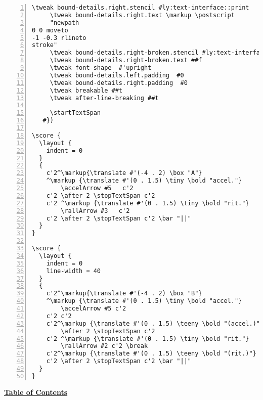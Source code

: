 \begin{Verbatim}[numbers=left,xleftmargin=5mm]
     \tweak bound-details.right.stencil #ly:text-interface::print
     \tweak bound-details.right.text \markup \postscript
     "newpath 
0 0 moveto 
-1 -0.3 rlineto 
stroke"
     \tweak bound-details.right-broken.stencil #ly:text-interface::print
     \tweak bound-details.right-broken.text ##f
     \tweak font-shape  #'upright
     \tweak bound-details.left.padding  #0
     \tweak bound-details.right.padding  #0
     \tweak breakable ##t
     \tweak after-line-breaking ##t

     \startTextSpan
   #})

\score {
  \layout {
    indent = 0
  }
  {
    c'2^\markup{\translate #'(-4 . 2) \box "A"}
    ^\markup {\translate #'(0 . 1.5) \tiny \bold "accel."} 
    	\accelArrow #5   c'2
    c'2 \after 2 \stopTextSpan c'2
    c'2 ^\markup {\translate #'(0 . 1.5) \tiny \bold "rit."}  
    	\rallArrow #3   c'2
    c'2 \after 2 \stopTextSpan c'2 \bar "||"
  }
}

\score {
  \layout {
    indent = 0
    line-width = 40
  }
  {
    c'2^\markup{\translate #'(-4 . 2) \box "B"}
    ^\markup {\translate #'(0 . 1.5) \tiny \bold "accel."} 
    	\accelArrow #5 c'2
    c'2 c'2
    c'2^\markup {\translate #'(0 . 1.5) \teeny \bold "(accel.)"} 
    	\after 2 \stopTextSpan c'2
    c'2 ^\markup {\translate #'(0 . 1.5) \tiny \bold "rit."}  
    	\rallArrow #2 c'2 \break
    c'2^\markup {\translate #'(0 . 1.5) \teeny \bold "(rit.)"} c'2
    c'2 \after 2 \stopTextSpan c'2 \bar "||"
  }
}
\end{Verbatim}

\hyperref[sec:toc]{\textbf{Table of Contents}}

\vfill \break


